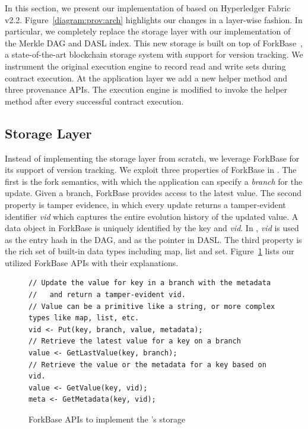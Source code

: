 In this section, we present our implementation of {\fs} based on Hyperledger Fabric v2.2. 
Figure~\ref{diagram:prov:arch} highlights our changes in a layer-wise fashion. 
In particular, we completely
replace the storage layer with our implementation of the Merkle DAG and DASL index. This new storage
is built on top of ForkBase~\cite{wang2018forkbase}, a state-of-the-art blockchain storage system
with support for version tracking.  We instrument the original execution engine to record read and write sets
during contract execution. At the application layer we add a new helper method and three provenance APIs. The
execution engine is modified to invoke the helper method after every successful contract execution.  


\subsection{Storage Layer}
Instead of implementing the storage layer from scratch, we leverage ForkBase for its support of version
tracking.  We exploit three properties of ForkBase in {\fs}. The first is the fork semantics, with which
the application can specify a \textit{branch} for the update. Given
a branch, ForkBase provides access to the latest value.  The second property is tamper evidence, in which
every update returns a tamper-evident identifier {\em vid} which captures the entire evolution history of the
updated value. A data object in ForkBase is uniquely identified by the key and {\em vid}. In {\fs}, {\em
vid} is used as the entry hash in the DAG, and as the pointer in DASL. The third property is the rich set of
built-in data types including map, list and set. 
Figure~\ref{code:prov:api} lists our utilized ForkBase APIs with their explanations. 

\begin{figure}
\centering
\footnotesize
\begin{verbatim}
// Update the value for key in a branch with the metadata 
//   and return a tamper-evident vid. 
// Value can be a primitive like a string, or more complex types like map, list, etc. 
vid <- Put(key, branch, value, metadata);
// Retrieve the latest value for a key on a branch
value <- GetLastValue(key, branch);
// Retrieve the value or the metadata for a key based on vid. 
value <- GetValue(key, vid);
meta <- GetMetadata(key, vid);
\end{verbatim}
\caption{ForkBase APIs to implement the {\fs}'s storage}
\label{code:prov:api}
\end{figure}

